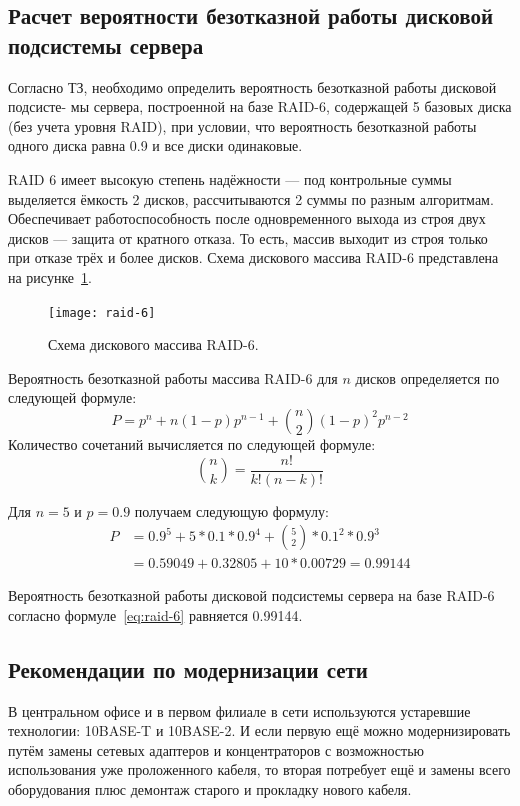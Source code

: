 \documentclass[russian,utf8,emptystyle]{eskdtext}
\begin{document}
\begin{enumerate}[label=\arabic*.]
\end{enumerate}

\clearpage
\subsection{Расчет вероятности безотказной работы дисковой подсистемы сервера}
Согласно ТЗ, необходимо определить вероятность безотказной работы дисковой подсисте-
мы сервера, построенной на базе RAID-6, содержащей 5 базовых диска (без учета уровня RAID),
при условии, что вероятность безотказной работы одного диска равна 0.9 и все диски одинаковые.

RAID 6 имеет высокую степень надёжности — под контрольные суммы выделяется ёмкость
2 дисков, рассчитываются 2 суммы по разным алгоритмам. Обеспечивает работоспособность после
одновременного выхода из строя двух дисков — защита от кратного отказа. То есть, массив выходит
из строя только при отказе трёх и более дисков. Схема дискового массива RAID-6 представлена на рисунке~\ref{fig:raid-6}.

\begin{figure}[h!]
\centering
\texttt{[image: raid-6]}
\caption{Схема дискового массива RAID-6.}
\label{fig:raid-6}
\end{figure}

Вероятность безотказной работы массива RAID-6 для $n$ дисков определяется по следующей формуле:
$$
P = p^n + n(1-p)p^{n-1} + {n \choose 2}(1-p)^2 p^{n-2}
$$
Количество сочетаний вычисляется по следующей формуле:
$$
{n \choose k} = \frac{n!}{k!(n-k)!}
$$

Для $n=5$ и $p=0.9$ получаем следующую формулу:
\begin{align} \label{eq:raid-6}
P & = 0.9^5 + 5*0.1*0.9^4 + {5 \choose 2}*0.1^2*0.9^3 \\
  & = 0.59049 + 0.32805 + 10*0.00729 = 0.99144
\end{align}

Вероятность безотказной работы дисковой подсистемы сервера на базе RAID-6 согласно формуле~\ref{eq:raid-6} равняется 0.99144.

\subsection{Рекомендации по модернизации сети}
В центральном офисе и в первом филиале в сети используются устаревшие технологии: 10BASE-T и 10BASE-2. И если первую ещё можно модернизировать путём замены сетевых адаптеров и концентраторов с возможностью использования уже проложенного кабеля, то вторая потребует ещё и замены всего оборудования плюс демонтаж старого и прокладку нового кабеля.
\end{document}
